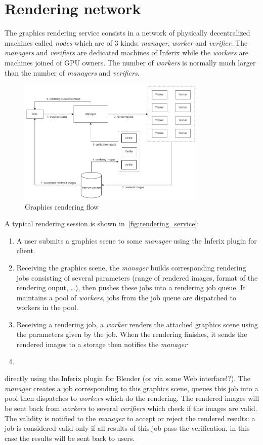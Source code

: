 \section[Rendering network]{Rendering network}
The graphics rendering service consists in a network of physically decentralized machines called \emph{nodes} which are of $3$ kinds: \emph{manager}, \emph{worker} and \emph{verifier}. The \emph{managers} and \emph{verifiers} are dedicated machines of Inferix while the \emph{workers} are machines joined of GPU owners. The number of \emph{workers} is normally much larger than the number of \emph{managers} and \emph{verifiers}.
\begin{figure}[h]
    \centering
    \includegraphics[width=0.8\textwidth]{rendering_service.png}
    \caption[Graphics rendering flow]{Graphics rendering flow}
    \label{fig:rendering_service}
\end{figure}
A typical rendering session is shown in~\autoref{fig:rendering_service}:
\begin{enumerate}
    \item A user submits a graphics scene to some \emph{manager} using the Inferix plugin for client.
    \item Receiving the graphics scene, the \emph{manager} builds corresponding rendering jobs consisting of several parameters (range of rendered images, format of the rendering ouput, \dots), then pushes these jobs into a rendering job queue. It maintains a pool of \emph{workers}, jobs from the job queue are dispatched to workers in the pool.
    \item Receiving a rendering job, a \emph{worker} renders the attached graphics scene using the parameters given by the job. When the rendering finishes, it sends the rendered images to a storage then notifies the \emph{manager}
    \item 
\end{enumerate}
 directly using the Inferix plugin for Blender (or via some Web interface!?). The \emph{manager} creates a job corresponding to this graphics scene, queues this job into a pool then dispatches to \emph{workers} which do the rendering. The rendered images will be sent back from \emph{workers} to several \emph{verifiers} which check if the images are valid. The validity is notified to the \emph{manager} to accept or reject the rendered results: a job is considered valid only if all results of this job pass the verification, in this case the results will be sent back to users.

